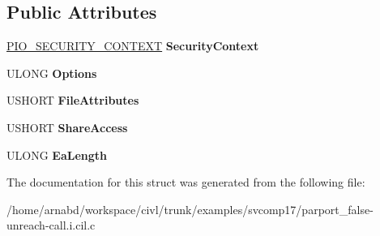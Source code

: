 \subsection*{Public Attributes}
\begin{DoxyCompactItemize}
\item 
\hypertarget{struct____anonstruct__Create__56_a946c0a4b730f836018140760f940fefd}{}\hyperlink{struct__IO__SECURITY__CONTEXT}{P\+I\+O\+\_\+\+S\+E\+C\+U\+R\+I\+T\+Y\+\_\+\+C\+O\+N\+T\+E\+X\+T} {\bfseries Security\+Context}\label{struct____anonstruct__Create__56_a946c0a4b730f836018140760f940fefd}

\item 
\hypertarget{struct____anonstruct__Create__56_ab5697316f1fe934ce1e9b23c7312286e}{}U\+L\+O\+N\+G {\bfseries Options}\label{struct____anonstruct__Create__56_ab5697316f1fe934ce1e9b23c7312286e}

\item 
\hypertarget{struct____anonstruct__Create__56_a06cf7d5cee7982e5080b025e116e368c}{}U\+S\+H\+O\+R\+T {\bfseries File\+Attributes}\label{struct____anonstruct__Create__56_a06cf7d5cee7982e5080b025e116e368c}

\item 
\hypertarget{struct____anonstruct__Create__56_aef4f6501449dfcb0473bd50c58f55bc5}{}U\+S\+H\+O\+R\+T {\bfseries Share\+Access}\label{struct____anonstruct__Create__56_aef4f6501449dfcb0473bd50c58f55bc5}

\item 
\hypertarget{struct____anonstruct__Create__56_a9db6ccdaee5b9a77948182de0ca35bb9}{}U\+L\+O\+N\+G {\bfseries Ea\+Length}\label{struct____anonstruct__Create__56_a9db6ccdaee5b9a77948182de0ca35bb9}

\end{DoxyCompactItemize}


The documentation for this struct was generated from the following file\+:\begin{DoxyCompactItemize}
\item 
/home/arnabd/workspace/civl/trunk/examples/svcomp17/parport\+\_\+false-\/unreach-\/call.\+i.\+cil.\+c\end{DoxyCompactItemize}
